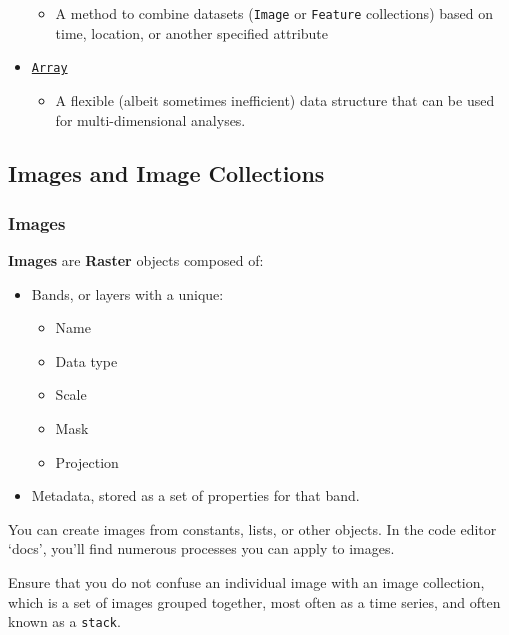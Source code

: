 \documentclass[
]{article}
\providecommand{\tightlist}{%
  \setlength{\itemsep}{0pt}\setlength{\parskip}{0pt}}
\begin{document}
\begin{itemize}
  \begin{itemize}
  \tightlist
  \item
    A method to combine datasets (\texttt{Image} or \texttt{Feature} collections) based on time, location, or another specified attribute
  \end{itemize}
\item
  \href{https://developers.google.com/earth-engine/guides/arrays_intro}{\texttt{Array}}

  \begin{itemize}
  \tightlist
  \item
    A flexible (albeit sometimes inefficient) data structure that can be used for multi-dimensional analyses.
  \end{itemize}
\end{itemize}

\hypertarget{images-and-image-collections}{%
\subsection{Images and Image Collections}\label{images-and-image-collections}}

\hypertarget{images}{%
\subsubsection{Images}\label{images}}

\textbf{Images} are \textbf{Raster} objects composed of:

\begin{itemize}
\tightlist
\item
  Bands, or layers with a unique:

  \begin{itemize}
  \tightlist
  \item
    Name
  \item
    Data type
  \item
    Scale
  \item
    Mask
  \item
    Projection
  \end{itemize}
\item
  Metadata, stored as a set of properties for that band.
\end{itemize}

You can create images from constants, lists, or other objects. In the code editor `docs', you'll find numerous processes you can apply to images.

Ensure that you do not confuse an individual image with an image collection, which is a set of images grouped together, most often as a time series, and often known as a \texttt{stack}.
\end{document}
